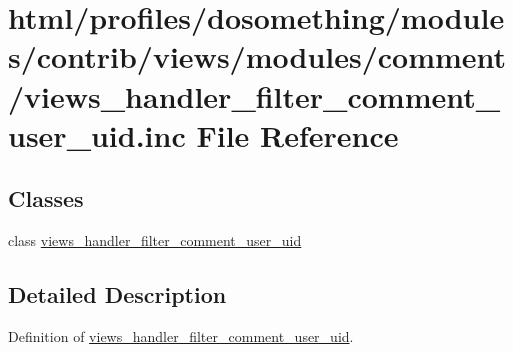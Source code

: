 \hypertarget{views__handler__filter__comment__user__uid_8inc}{
\section{html/profiles/dosomething/modules/contrib/views/modules/comment/views\_\-handler\_\-filter\_\-comment\_\-user\_\-uid.inc File Reference}
\label{views__handler__filter__comment__user__uid_8inc}
}
\subsection*{Classes}
\begin{DoxyCompactItemize}
\item 
class \hyperlink{classviews__handler__filter__comment__user__uid}{views\_\-handler\_\-filter\_\-comment\_\-user\_\-uid}
\end{DoxyCompactItemize}


\subsection{Detailed Description}
Definition of \hyperlink{classviews__handler__filter__comment__user__uid}{views\_\-handler\_\-filter\_\-comment\_\-user\_\-uid}. 